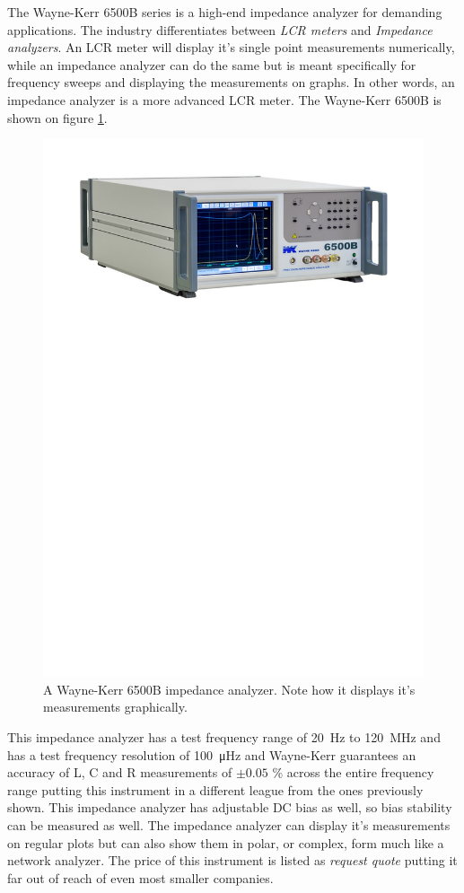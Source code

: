 The Wayne-Kerr 6500B\cite{WayneKerr6500} series is a high-end impedance analyzer for demanding applications. The industry differentiates between \textit{LCR meters} and \textit{Impedance analyzers}. An LCR meter will display it's single point measurements numerically, while an impedance analyzer can do the same but is meant specifically for frequency sweeps and displaying the measurements on graphs. In other words, an impedance analyzer is a more advanced LCR meter. The Wayne-Kerr 6500B is shown on figure \ref{fig:2_2_WayneKerr6500B}. 
\begin{figure}[H]
    \centering
    \includegraphics[clip, trim=0 550 0 50, width=1\textwidth]{Sections/2_ProblemAnalysis/FIgures/WayneKerrImpedanceAnalyzer.pdf}
    \caption{A Wayne-Kerr 6500B impedance analyzer. Note how it displays it's measurements graphically.}
    \label{fig:2_2_WayneKerr6500B}
\end{figure}
This impedance analyzer has a test frequency range of \SI[]{20}{\hertz} to \SI[]{120}{\mega\hertz} and has a test frequency resolution of \SI[]{100}{\micro\hertz} and Wayne-Kerr guarantees an accuracy of L, C and R measurements of $\pm 0.05$ \% across the entire frequency range putting this instrument in a different league from the ones previously shown. This impedance analyzer has adjustable DC bias as well, so bias stability can be measured as well. The impedance analyzer can display it's measurements on regular plots but can also show them in polar, or complex, form much like a network analyzer. The price of this instrument is listed as \textit{request quote} putting it far out of reach of even most smaller companies.

